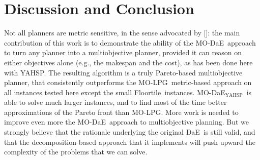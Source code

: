 \documentclass[letterpaper]{article}
\def\DAE{{\sc DaE}}
\def\YAHSP{{\sc YAHSP}}
\def\MODAE{{\sc MO-DaE}}
\newcommand{\MODAEYAHSP}{{\sc MO-DaE$_{\text{YAHSP}}$}}
\newcommand{\MOLPG}{{\sc MO-LPG}}
\newcommand{\FLOORTILE}{{\sc Floortile}}
\begin{document}
\section{Discussion and Conclusion}
\label{sec:conclusion}

Not all planners are metric sensitive, in the sense advocated by \citeauthor{LPG-STAIRS2012} [\citeyear{LPG-STAIRS2012}]: the main contribution of this work is to demonstrate the ability of the \MODAE\ approach to turn any planner into a multiobjective planner, provided it can reason on either objectives alone (e.g., the makespan and the cost), as has been done here with \YAHSP. The resulting algorithm is a truly Pareto-based multiobjective planner, that consistently outperforms the \MOLPG\ metric-based approach on all instances tested here except the small \FLOORTILE\ instances. \MODAEYAHSP\ is able to solve much larger instances, and to find most of the time better approximations of the Pareto front than \MOLPG. 
More work is needed to improve even more the \MODAE\ approach to multiobjective planning. But we strongly believe that the rationale underlying the original \DAE\ is still valid, and that the decomposition-based approach that it implements will push upward the complexity of the problems that we can solve.
\end{document}
